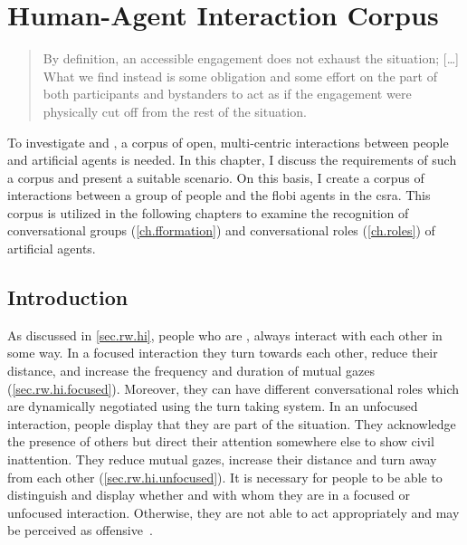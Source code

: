 \chapter{Human-Agent Interaction Corpus}\label{sec.group.corpus}

\blockcquote[p. 156]{goffman1963}{By definition, an accessible engagement does not exhaust the situation; [\dots] What we find instead is some obligation and some effort on the part of both participants and bystanders to act as if the engagement were physically cut off from the rest of the situation.}

To investigate  and , a corpus of open, multi-centric interactions between people and \glspl{artificial agent} is needed.
In this chapter, I discuss the requirements of such a corpus and present a suitable scenario.
On this basis, I create a corpus of interactions between a group of people and the \gls{flobi} agents in the \gls{csra}.
This corpus is utilized in the following chapters to examine the recognition of \glspl{conversational group} (\cref{ch.fformation}) and \glspl{conversational role} (\cref{ch.roles}) of \glspl{artificial agent}. 
 
\section{Introduction}

As discussed in \cref{sec.rw.hi}, people who are , always interact with each other in some way.
In a \gls{focused interaction} they \gls{turn} towards each other, reduce their distance, and increase the frequency and duration of mutual gazes (\cref{sec.rw.hi.focused}).
Moreover, they can have different \glspl{conversational role} which are dynamically negotiated using the \gls{turn taking system}.
In an \gls{unfocused interaction}, people display that they are part of the situation.
They acknowledge the presence of others but direct their attention somewhere else to show \gls{civil inattention}.
They reduce mutual gazes, increase their distance and \gls{turn} away from each other (\cref{sec.rw.hi.unfocused}).
It is necessary for people to be able to distinguish and display whether and with whom they are in a focused or \gls{unfocused interaction}.
Otherwise, they are not able to act appropriately and may be perceived as offensive~\cite[p. 29, p. 157]{goffman1963}.

